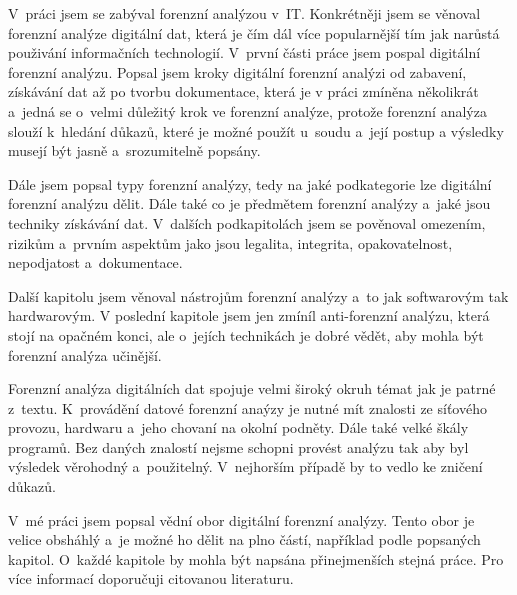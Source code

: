 \documentclass[thesis=B,czech]{FITthesis}[2012/06/26]
\begin{document}
\begin{conclusion}
V~práci jsem se zabýval forenzní analýzou v~IT. Konkrétněji jsem se věnoval forenzní analýze digitální dat, která je čím dál více popularnější tím jak narůstá použivání informačních technologií. V~první části práce jsem pospal digitální forenzní analýzu. Popsal jsem kroky digitální forenzní analýzi od zabavení, získávání dat až po tvorbu dokumentace, která je v práci zmíněna několikrát a~jedná se o~velmi důležitý krok ve forenzní analýze, protože forenzní analýza slouží k~hledání důkazů, které je možné použít u~soudu a~její postup a výsledky musejí být jasně a~srozumitelně popsány. 

Dále jsem popsal typy forenzní analýzy, tedy na jaké podkategorie lze digitální forenzní analýzu dělit. Dále také co je předmětem forenzní analýzy a~jaké jsou techniky získávání dat. V~dalších podkapitolách jsem se pověnoval omezením, rizikům a~prvním aspektům jako jsou legalita, integrita, opakovatelnost, nepodjatost a~dokumentace. 

Další kapitolu jsem věnoval nástrojům forenzní analýzy a~to jak softwarovým tak hardwarovým. V poslední kapitole jsem jen zmíníl anti-forenzní analýzu, která stojí na opačném konci, ale o~jejích technikách je dobré vědět, aby mohla být forenzní analýza učinější. 

Forenzní analýza digitálních dat spojuje velmi široký okruh témat jak je patrné z~textu. K~provádění datové forenzní anaýzy je nutné mít znalosti ze síťového provozu, hardwaru a~jeho chovaní na okolní podněty. Dále také velké škály programů. Bez daných znalostí nejsme schopni provést analýzu tak aby byl výsledek věrohodný a~použitelný. V~nejhorším případě by to vedlo ke zničení důkazů. 

V~mé práci jsem popsal vědní obor digitální forenzní analýzy. Tento obor je velice obsháhlý a~je možné ho dělit na plno částí, například podle popsaných kapitol. O~každé kapitole by mohla být napsána přinejmenších stejná práce. Pro více informací doporučuji citovanou literaturu.


\end{conclusion}




\appendix
\end{document}
